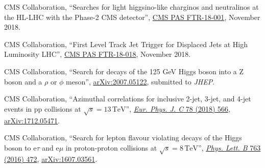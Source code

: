 \begin{description}[leftmargin=12pt,font=\normalfont\textit]
\begin{description}[leftmargin=12pt,font=\normalfont,labelsep=0em]
\item CMS Collaboration, ``Searches for light higgsino-like charginos and neutralinos at the HL-LHC with the Phase-2 CMS detector'', \href{https://cds.cern.ch/record/2648538}{CMS PAS FTR-18-001}, November 2018.
\item CMS Collaboration, ``First Level Track Jet Trigger for Displaced Jets at High Luminosity LHC'', \href{https://cds.cern.ch/record/2647987}{CMS PAS FTR-18-018}, November 2018.
\end{description}
\item[FNAL institution review leader:]
\begin{description}[leftmargin=12pt,font=\normalfont,labelsep=0em]\item[]
\item CMS Collaboration, ``Search for decays of the 125 GeV Higgs boson into a Z boson and a $\rho$ or $\phi$ meson'', \href{https://arxiv.org/abs/2007.05122}{arXiv:2007.05122}, submitted to \emph{JHEP}.
\item CMS Collaboration, ``Azimuthal correlations for inclusive 2-jet, 3-jet, and 4-jet events in pp collisions at $\sqrt{s} = 13\,\text{TeV}$'', \href{http://dx.doi.org/10.1140/epjc/s10052-018-6033-4}{\emph{Eur. Phys. J. C} 78 (2018) 566}, \href{http://arxiv.org/abs/1712.05471}{arXiv:1712.05471}.
\item CMS Collaboration, ``Search for lepton flavour violating decays of the Higgs boson to e$\tau$ and e$\mu$ in proton-proton collisions at $\sqrt{s} = 8\,\text{TeV}$'', \href{http://dx.doi.org/10.1016/j.physletb.2016.09.062}{\emph{Phys. Lett. B} 763 (2016) 472}, \href{http://arxiv.org/abs/1607.03561}{arXiv:1607.03561}.
\end{description}
\end{description}